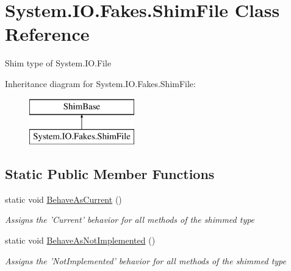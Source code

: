 \hypertarget{class_system_1_1_i_o_1_1_fakes_1_1_shim_file}{\section{System.\-I\-O.\-Fakes.\-Shim\-File Class Reference}
\label{class_system_1_1_i_o_1_1_fakes_1_1_shim_file}
}


Shim type of System.\-I\-O.\-File 


Inheritance diagram for System.\-I\-O.\-Fakes.\-Shim\-File\-:\begin{figure}[H]
\begin{center}
\leavevmode
\includegraphics[height=2.000000cm]{class_system_1_1_i_o_1_1_fakes_1_1_shim_file}
\end{center}
\end{figure}
\subsection*{Static Public Member Functions}
\begin{DoxyCompactItemize}
\item 
static void \hyperlink{class_system_1_1_i_o_1_1_fakes_1_1_shim_file_af292c66b0a05786dd3e90e6bf57763fc}{Behave\-As\-Current} ()
\begin{DoxyCompactList}\small\item\em Assigns the 'Current' behavior for all methods of the shimmed type\end{DoxyCompactList}\item 
static void \hyperlink{class_system_1_1_i_o_1_1_fakes_1_1_shim_file_abf96aee1cef69913d6051a615fead444}{Behave\-As\-Not\-Implemented} ()
\begin{DoxyCompactList}\small\item\em Assigns the 'Not\-Implemented' behavior for all methods of the shimmed type\end{DoxyCompactList}\end{DoxyCompactItemize}
